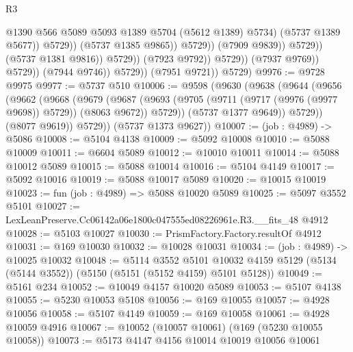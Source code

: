 \begin{lexlean}{R3}
\begin{coremodule}
                                                    @1390
                                                    @566
                                                    @5089
                                                    @5093
                                                    @1389
                                                    @5704
                                                    (@5612 @1389)
                                                    @5734)
                                                  (@5737 @1389 @5677))
                                                @5729))
                                            (@5737 @1385 @9865))
                                          @5729))
                                      (@7909 @9839))
                                    @5729))
                                (@5737 @1381 @9816))
                              @5729))
                          (@7923 @9792))
                        @5729))
                    (@7937 @9769))
                  @5729))
              (@7944 @9746))
            @5729))
        (@7951 @9721))
      @5729)
@9976 := @9728 @9975
@9977 := @5737 @510
@10006 := @9598
    (@9630
      (@9638
        (@9644
          (@9656
            (@9662
              (@9668
                (@9679
                  (@9687
                    (@9693 (@9705 (@9711 (@9717 (@9976 (@9977 @9698)) @5729)) (@8063 @9672)) @5729))
                  (@5737 @1377 @9649))
                @5729))
            (@8077 @9619))
          @5729))
      (@5737 @1373 @9627))
@10007 := (job : @4989) -> @5086
@10008 := @5104 @4138
@10009 := @5092 @10008
@10010 := @5088 @10009
@10011 := @6604 @5089
@10012 := @10010 @10011
@10014 := @5088 @10012 @5089
@10015 := @5088 @10014
@10016 := @5104 @4149
@10017 := @5092 @10016
@10019 := @5088 @10017 @5089
@10020 := @10015 @10019
@10023 := fun (job : @4989) => @5088 @10020 @5089
@10025 := @5097 @3552 @5101
@10027 := LexLeanPreserve.Cc06142a06e1800c047555ed08226961e.R3.__fits_48 @4912
@10028 := @5103 @10027
@10030 := PrismFactory.Factory.resultOf @4912
@10031 := @169 @10030
@10032 := @10028 @10031
@10034 := (job : @4989) -> @10025 @10032
@10048 := @5114
    @3552
    @5101
    @10032
    @4159
    @5129
    (@5134 (@5144 @3552))
    (@5150 (@5151 (@5152 @4159) @5101 @5128))
@10049 := @5161 @234
@10052 := @10049 @4157 @10020 @5089
@10053 := @5107 @4138
@10055 := @5230 @10053 @5108
@10056 := @169 @10055
@10057 := @4928 @10056
@10058 := @5107 @4149
@10059 := @169 @10058
@10061 := @4928 @10059 @4916
@10067 := @10052 (@10057 @10061) (@169 (@5230 @10055 @10058))
@10073 := @5173 @4147 @4156 @10014 @10019 @10056 @10061

\end{coremodule}
\end{lexlean}
